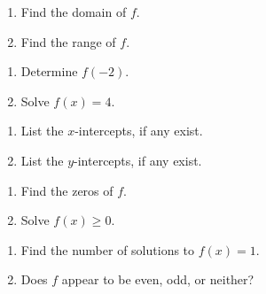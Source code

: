 \begin{multicols}{2}
\begin{enumerate}
\setcounter{enumi}{\value{HW}}

\item  Find the domain of $f$. \label{usefuncgraphfirst}
\item  Find the range of $f$.

\setcounter{HW}{\value{enumi}}
\end{enumerate}
\end{multicols}

\begin{multicols}{2}
\begin{enumerate}
\setcounter{enumi}{\value{HW}}

\item  Determine $f(-2)$.
\item  Solve $f(x) = 4$.

\setcounter{HW}{\value{enumi}}
\end{enumerate}
\end{multicols}

\begin{multicols}{2}
\begin{enumerate}
\setcounter{enumi}{\value{HW}}

\item  List the $x$-intercepts, if any exist.
\item  List the $y$-intercepts, if any exist.

\setcounter{HW}{\value{enumi}}
\end{enumerate}
\end{multicols}

\begin{multicols}{2}
\begin{enumerate}
\setcounter{enumi}{\value{HW}}

\item  Find the zeros of $f$.
\item  Solve $f(x) \geq 0$.

\setcounter{HW}{\value{enumi}}
\end{enumerate}
\end{multicols}

\begin{multicols}{2}
\begin{enumerate}
\setcounter{enumi}{\value{HW}}

\item  Find the number of solutions to $f(x) = 1$.
\item  Does $f$ appear to be even, odd, or neither?

\setcounter{HW}{\value{enumi}}
\end{enumerate}
\end{multicols}

